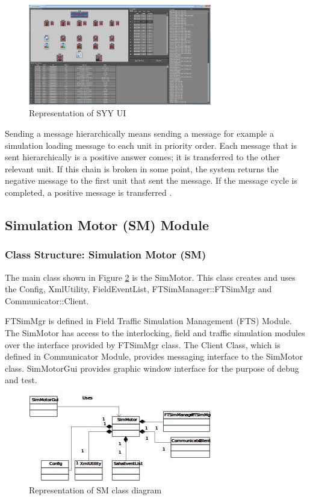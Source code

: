 \documentclass[conference]{IEEEtran}
\begin{document}
\begin{figure}[h!]
  \centering
  \includegraphics[width=8cm]{syygrafic.jpg}
  \caption{Representation of SYY UI}\label{fig:syygrafic}
\end{figure}

Sending a message hierarchically means sending a message for example a simulation loading message to each unit in priority order. Each message that is sent hierarchically is a positive answer comes; it is transferred to the other relevant unit. If this chain is broken in some point, the system returns the negative message to the first unit that sent the message. If the message cycle is completed, a positive message is transferred \cite{network2}. 

\subsection{Simulation Motor (SM) Module}
\subsubsection{Class Structure: Simulation Motor (SM)}
The main class shown in Figure \ref{fig:smgrafic} is the SimMotor. This class creates and uses the Config, XmlUtility, FieldEventList, FTSimManager::FTSimMgr and Communicator::Client.

FTSimMgr is defined in Field Traffic Simulation Management (FTS) Module. The SimMotor has access to the interlocking, field and traffic simulation modules over the interface provided by FTSimMgr class. The Client Class, which is defined in Communicator Module, provides messaging interface to the SimMotor class. SimMotorGui provides graphic window interface for the purpose of debug and test.


\begin{figure}[h!]
  \centering
  \includegraphics[width=8cm]{smgrafic.jpg}
  \caption{Representation of SM class diagram}\label{fig:smgrafic}
\end{figure}
\end{document}
